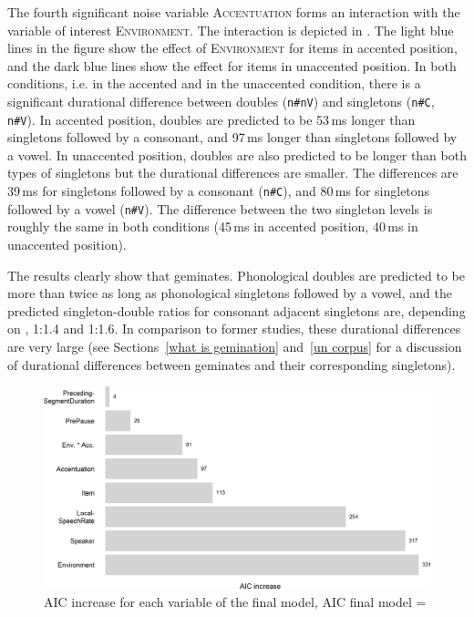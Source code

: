 The fourth significant noise variable \textsc{Accentuation} forms an interaction with the variable of interest \textsc{Environment}. The interaction is depicted in .
The light blue lines in the figure show the effect of \textsc{Environment} for items in accented position, and the dark blue lines show the effect for items in unaccented position. In both conditions, i.e. in the accented and in the unaccented condition, there is a significant durational difference between doubles (\texttt{n\#nV}) and singletons (\texttt{n\#C}, \texttt{n\#V}). 
 In accented position, doubles are predicted to be 53\,ms longer than singletons followed by a consonant, and 97\,ms longer than singletons followed by a vowel. 
 In unaccented position, doubles are also predicted to be longer than both types of singletons but the durational differences are smaller. The differences are 39\,ms  for singletons followed by a consonant (\texttt{n\#C}), and 80\,ms for singletons followed by a vowel (\texttt{n\#V}). The difference between the two singleton levels is roughly the same in both conditions (45\,ms in accented position, 40\,ms in unaccented position).




 The results clearly show that  geminates. Phonological doubles are predicted to be more than twice as long as phonological singletons followed by a vowel, and the predicted singleton-double ratios for consonant adjacent singletons are, depending on , 1:1.4 and 1:1.6. In comparison to former studies, these durational differences are very large (see Sections~\ref{what is gemination} and~\ref{un corpus} for a discussion of durational differences between geminates and their corresponding singletons). 




\begin{figure}
	
	
	\includegraphics[scale=0.7] {images/Experiment/AICdecreaseUnComplex.png}


	\caption{AIC increase for each variable of the final model, AIC final model = }
	\label{fig:Effect sozed un Exp unV vs Unn}

\end{figure}



